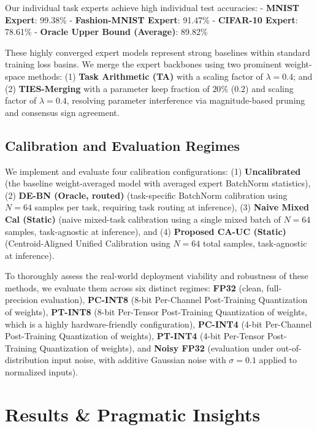 \documentclass{article}
\theoremstyle{plain}
\theoremstyle{definition}
\theoremstyle{remark}
\begin{document}
Our individual task experts achieve high individual test accuracies:
- \textbf{MNIST Expert}: 99.38\%
- \textbf{Fashion-MNIST Expert}: 91.47\%
- \textbf{CIFAR-10 Expert}: 78.61\%
- \textbf{Oracle Upper Bound (Average)}: 89.82\%

These highly converged expert models represent strong baselines within standard training loss basins. We merge the expert backbones using two prominent weight-space methods: (1) \textbf{Task Arithmetic (TA)} \cite{Ilharco2023TaskArithmetic} with a scaling factor of $\lambda = 0.4$; and (2) \textbf{TIES-Merging} \cite{Yadav2023Ties} with a parameter keep fraction of $20\%$ ($0.2$) and scaling factor of $\lambda = 0.4$, resolving parameter interference via magnitude-based pruning and consensus sign agreement.

\subsection{Calibration and Evaluation Regimes}
We implement and evaluate four calibration configurations: (1) \textbf{Uncalibrated} (the baseline weight-averaged model with averaged expert BatchNorm statistics), (2) \textbf{DE-BN (Oracle, routed)} (task-specific BatchNorm calibration using $N = 64$ samples per task, requiring task routing at inference), (3) \textbf{Naive Mixed Cal (Static)} (naive mixed-task calibration using a single mixed batch of $N = 64$ samples, task-agnostic at inference), and (4) \textbf{Proposed CA-UC (Static)} (Centroid-Aligned Unified Calibration using $N = 64$ total samples, task-agnostic at inference).

To thoroughly assess the real-world deployment viability and robustness of these methods, we evaluate them across six distinct regimes: \textbf{FP32} (clean, full-precision evaluation), \textbf{PC-INT8} (8-bit Per-Channel Post-Training Quantization of weights), \textbf{PT-INT8} (8-bit Per-Tensor Post-Training Quantization of weights, which is a highly hardware-friendly configuration), \textbf{PC-INT4} (4-bit Per-Channel Post-Training Quantization of weights), \textbf{PT-INT4} (4-bit Per-Tensor Post-Training Quantization of weights), and \textbf{Noisy FP32} (evaluation under out-of-distribution input noise, with additive Gaussian noise with $\sigma = 0.1$ applied to normalized inputs).

\vspace{-8pt}
\section{Results \& Pragmatic Insights}
\label{sec:results}
\end{document}
